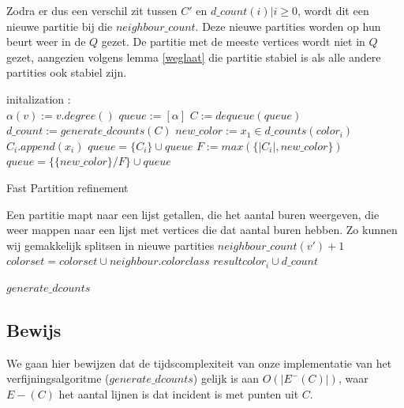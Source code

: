 \documentclass[twoside]{article}
\begin{document}
\begin{multicols}{2}
Zodra er dus een verschil zit tussen $C'$ en $d\_count(i) | i\geq 0$, wordt dit een nieuwe partitie bij die $neighbour\_count$. Deze nieuwe partities worden op hun beurt weer in de $Q$ gezet. De partitie met de meeste vertices wordt niet in $Q$ gezet, aangezien volgens lemma \ref{weglaat} die partitie stabiel is als alle andere partities ook stabiel zijn.

\begin{algorithm}[H]
initalization \;
: \\
{$\alpha(v) := v.degree()$}
$queue := [\alpha]$\;
{$C := dequeue(queue)$\;
$d\_count := generate\_dcounts(C)$\;
{
{$new\_color := x_{1} \in d\_counts(color_{i})$ \;
{$C_{i}.append(x_{i}) $ }
{$ queue = \{C_{i}\} \cup queue $ \;}
{	$ F := max(\{|C_{i}|, new\_color \} ) $ \;
$queue = \{ \{new\_color \} / F \} \cup queue $}}}}
\caption{Fast Partition refinement}
\EndFunction
\end{algorithm}
\pagebreak

\begin{algorithm}[H]
Een partitie mapt naar een lijst getallen, die het aantal buren weergeven, die weer mappen naar een lijst met vertices die dat aantal buren hebben. Zo kunnen wij gemakkelijk splitsen in nieuwe partities \;
{
{$ neighbour\_count(v') + 1 $ \;
$ colorset = colorset \cup  neighbour.colorclass  $  \;}}
{
$ result color_{i} \cup d\_count $}
\caption{$ generate\_dcounts $}
\end{algorithm}

\subsection{Bewijs}

We gaan hier bewijzen dat de tijdscomplexiteit van onze implementatie van het verfijningsalgoritme ($generate\_dcounts$) gelijk is aan $ O(|E^{-}(C)|)$,  waar $ E{-}(C) $ het aantal lijnen is dat incident is met punten uit $C$.


\end{multicols}
\end{document}
